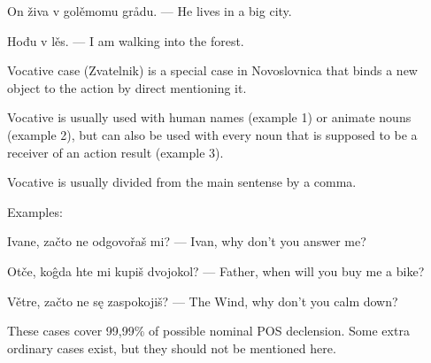On živa v golěmomu grådu. — He lives in a big city.

Hođu v lěs. — I am walking into the forest.

Vocative case (Zvatelnik) is a special case in Novoslovnica that binds a new object to the action by direct mentioning it.

Vocative is usually used with human names (example 1) or animate nouns (example 2), but can also be used with every noun that is supposed to be a receiver of an action result (example 3).

Vocative is usually divided from the main sentense by a comma.

Examples:

Ivane, začto ne odgovořaš mi? — Ivan, why don't you answer me?

Otče, koĝda hte mi kupiš dvojokol? — Father, when will you buy me a bike?

Větre, začto ne sę zaspokojiš? — The Wind, why don't you calm down?

These cases cover 99,99\% of possible nominal POS declension. Some extra ordinary cases exist, but they should not be mentioned here.
